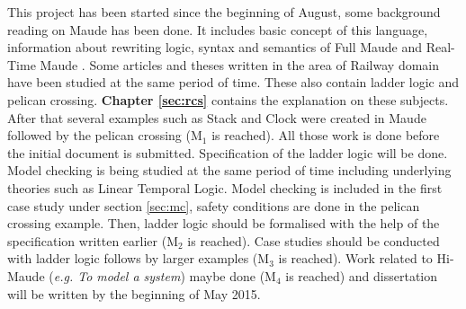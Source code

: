 \documentclass[a4paper,11pt]{report}
\begin{document}
This project has been started since the beginning of August, some background reading on Maude has been done. It includes basic concept of this language, information about rewriting logic, syntax and semantics of Full Maude and Real-Time Maude \cite{primer}. Some articles and theses written in the area of Railway domain have been studied at the same period of time. These also contain ladder logic and pelican crossing. \textbf{Chapter \ref{sec:rcs}} contains the explanation on these subjects. After that several examples such as Stack and Clock were created in Maude followed by the pelican crossing (M$_{1}$ is reached). All those work is done before the initial document is submitted. Specification of the ladder logic will be done. Model checking is being studied at the same period of time including underlying theories such as Linear Temporal Logic. Model checking is included in the first case study under section \ref{sec:mc}, safety conditions are done in the pelican crossing example. Then, ladder logic should be formalised with the help of the specification written earlier (M$_{2}$ is reached). Case studies should be conducted with ladder logic follows by larger examples (M$_{3}$ is reached). Work related to Hi-Maude (\textit{e.g. To model a system}) maybe done (M$_{4}$ is reached) and dissertation will be written by the beginning of May 2015.
\newpage
\end{document}

